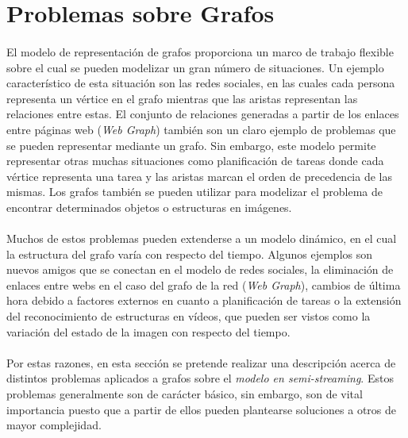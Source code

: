 \documentclass{subfiles}
\begin{document}
    \section{Problemas sobre Grafos}
    \label{sec:graph_problems}

      \paragraph{}
      El modelo de representación de grafos proporciona un marco de trabajo flexible sobre el cual se pueden modelizar un gran número de situaciones. Un ejemplo característico de esta situación son las redes sociales, en las cuales cada persona representa un vértice en el grafo mientras que las aristas representan las relaciones entre estas. El conjunto de relaciones generadas a partir de los enlaces entre páginas web (\emph{Web Graph}) también son un claro ejemplo de problemas que se pueden representar mediante un grafo. Sin embargo, este modelo permite representar otras muchas situaciones como planificación de tareas donde cada vértice representa una tarea y las aristas marcan el orden de precedencia de las mismas. Los grafos también se pueden utilizar para modelizar el problema de encontrar determinados objetos o estructuras en imágenes.

      \paragraph{}
      Muchos de estos problemas pueden extenderse a un modelo dinámico, en el cual la estructura del grafo varía con respecto del tiempo. Algunos ejemplos son nuevos amigos que se conectan en el modelo de redes sociales, la eliminación de enlaces entre webs en el caso del grafo de la red (\emph{Web Graph}), cambios de última hora debido a factores externos en cuanto a planificación de tareas o la extensión del reconocimiento de estructuras en vídeos, que pueden ser vistos como la variación del estado de la imagen con respecto del tiempo.

      \paragraph{}
      Por estas razones, en esta sección se pretende realizar una descripción acerca de distintos problemas aplicados a grafos sobre el \emph{modelo en semi-streaming}. Estos problemas generalmente son de carácter básico, sin embargo, son de vital importancia puesto que a partir de ellos pueden plantearse soluciones a otros de mayor complejidad.
\end{document}
